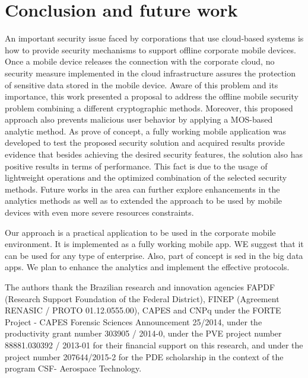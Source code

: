 \documentclass[twocolumn]{svjour3}          	%
\begin{document}
\section{Conclusion and future work }
\label{sec_conclusion}
An important security issue faced by corporations that use cloud-based systems is how to provide security mechanisms to support offline corporate mobile devices. Once a mobile device releases the connection with the corporate cloud, no security measure implemented in the cloud infrastructure assures the protection of sensitive data stored in the mobile device. Aware of this problem and its importance, this work presented a proposal to address the offline mobile security problem combining a different cryptographic methods. Moreover, this proposed approach also prevents malicious user behavior by applying a MOS-based analytic method. As prove of concept, a fully working mobile application was developed to test the proposed security solution and acquired results provide evidence that besides achieving the desired security features, the solution also has positive results in terms of performance. This fact is due to the usage of lightweight operations and the optimized combination of the selected security methods. 
Future works in the area can further explore enhancements in the analytics methods as well as to extended the approach to be used by mobile devices with even more severe resources constraints.   

Our approach is a practical application to be used in the corporate mobile environment. It is implemented as a fully working mobile app. WE suggest that it can be used for any type of enterprise. Also, part of concept is sed in the big data apps. We plan to enhance the analytics and implement the effective protocols.

\begin{acknowledgements}
The authors thank the Brazilian research and innovation agencies FAPDF (Research Support Foundation of the Federal District), FINEP (Agreement RENASIC / PROTO 01.12.0555.00), CAPES and CNPq under the FORTE Project - CAPES Forensic Sciences Announcement 25/2014, under the productivity grant number 303905 / 2014-0, under the PVE project number 88881.030392 / 2013-01 for their financial support on this research, and under the project number 207644/2015-2 for the PDE scholarship in the context of the program CSF- Aerospace Technology.\end{acknowledgements}

\end{document}
